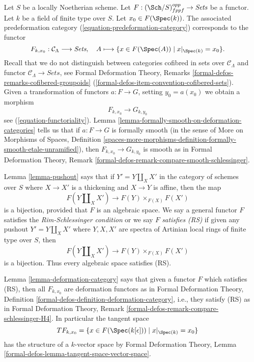 \medskip\noindent
Let $S$ be a locally Noetherian scheme. Let
$F : (\Sch/S)_{fppf}^{opp} \to \textit{Sets}$ be a functor. Let $k$ be
a field of finite type over $S$. Let $x_0 \in F(\Spec(k))$.
The associated predeformation category (\ref{equation-predeformation-category})
corresponds to the functor
$$
F_{k, x_0} : \mathcal{C}_\Lambda \longrightarrow \textit{Sets},
\quad
A \longmapsto \{x \in F(\Spec(A)) \mid x|_{\Spec(k)} = x_0 \}.
$$
Recall that we do not distinguish between
categories cofibred in sets over $\mathcal{C}_\Lambda$
and functor $\mathcal{C}_\Lambda \to \textit{Sets}$,
see Formal Deformation Theory, Remarks
\ref{formal-defos-remarks-cofibered-groupoids}
(\ref{formal-defos-item-convention-cofibered-sets}).
Given a transformation of functors $a : F \to G$, setting
$y_0 = a(x_0)$ we obtain a morphism
$$
F_{k, x_0} \longrightarrow G_{k, y_0}
$$
see (\ref{equation-functoriality}).
Lemma \ref{lemma-formally-smooth-on-deformation-categories} tells us that if
$a : F \to G$ is formally smooth (in the sense of
More on Morphisms of Spaces, Definition
\ref{spaces-more-morphisms-definition-formally-smooth-etale-unramified}), then
$F_{k, x_0} \longrightarrow G_{k, y_0}$ is smooth as
in Formal Deformation Theory, Remark
\ref{formal-defos-remark-compare-smooth-schlessinger}.

\medskip\noindent
Lemma \ref{lemma-pushout} says that if $Y' = Y \amalg_X X'$ in the
category of schemes over $S$ where $X \to X'$ is a thickening and
$X \to Y$ is affine, then the map
$$
F(Y \amalg_X X') \to F(Y) \times_{F(X)} F(X')
$$
is a bijection, provided that $F$ is an algebraic space.
We say a general functor $F$ satisfies the {\it Rim-Schlessinger condition}
or we say $F$ {\it satisfies (RS)} if given any
pushout $Y' = Y \amalg_X X'$ where $Y, X, X'$ are spectra of Artinian
local rings of finite type over $S$, then
$$
F(Y \amalg_X X') \to F(Y) \times_{F(X)} F(X')
$$
is a bijection. Thus every algebraic space satisfies (RS).

\medskip\noindent
Lemma \ref{lemma-deformation-category} says that
given a functor $F$ which satisfies (RS), then all $F_{k, x_0}$
are deformation functors as in
Formal Deformation Theory, Definition
\ref{formal-defos-definition-deformation-category}, i.e., they satisfy
(RS) as in
Formal Deformation Theory, Remark
\ref{formal-defos-remark-compare-schlessinger-H4}.
In particular the tangent space
$$
TF_{k, x_0} = \{x \in F(\Spec(k[\epsilon])) \mid x|_{\Spec(k)} = x_0\}
$$
has the structure of a $k$-vector space by Formal Deformation Theory,
Lemma \ref{formal-defos-lemma-tangent-space-vector-space}.

